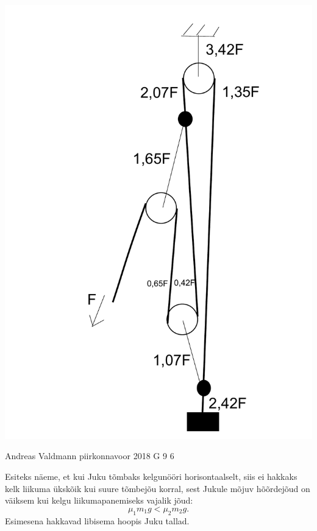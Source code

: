 \documentclass[11pt, twoside]{article}
\begin{document}
{{\begin{center}
\includegraphics[scale=0.25]{2014-v3g-06-PolyspastL2}
\end{center}
\fi
}

{Andreas Valdmann} %
{piirkonnavoor} %
{2018} %
{G 9} %
{6} %
{

\ifSolution
Esiteks näeme, et kui Juku tõmbaks kelgunööri horisontaalselt, siis ei hakkaks kelk liikuma ükskõik kui suure tõmbejõu korral, sest Jukule mõjuv hõõrdejõud on väiksem kui kelgu liikumapanemiseks vajalik jõud:
\[
\mu_1 m_1 g < \mu_2 m_2 g.
\]
Esimesena hakkavad libisema hoopis Juku tallad.

}}
\end{document}
